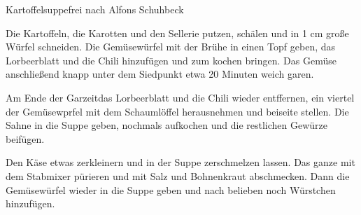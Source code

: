 \begin{recipe}{Kartoffelsuppe}{frei nach Alfons Schuhbeck}
  \inglist

  \steps
  Die Kartoffeln, die Karotten und den Sellerie putzen, schälen und in 1 cm große Würfel
  schneiden. Die Gemüsewürfel mit der Brühe in einen Topf geben, das Lorbeerblatt und die
  Chili hinzufügen und zum kochen bringen. Das Gemüse anschließend knapp unter dem
  Siedpunkt etwa 20 Minuten weich garen.

  Am Ende der Garzeitdas Lorbeerblatt und die Chili wieder entffernen, ein viertel der
  Gemüsewprfel mit dem Schaumlöffel herausnehmen und beiseite stellen. Die Sahne in die
  Suppe geben, nochmals aufkochen und die restlichen Gewürze beifügen.

  Den Käse etwas zerkleinern und in der Suppe zerschmelzen lassen. Das ganze mit dem
  Stabmixer pürieren und mit Salz und Bohnenkraut abschmecken. Dann die Gemüsewürfel
  wieder in die Suppe geben und nach belieben noch Würstchen hinzufügen.
\end{recipe}

